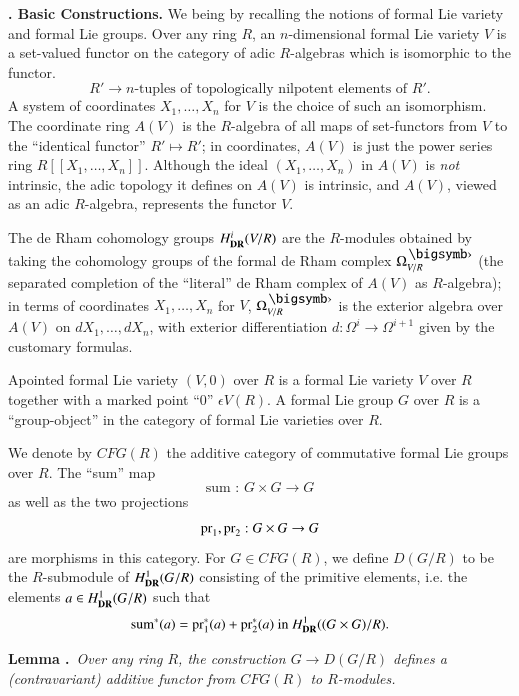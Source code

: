 \noindent
{\bf {}.\label{art6-sec5.1} Basic Constructions.}
We being by recalling the notions of formal Lie variety and formal Lie groups. Over any ring $R$, an $n$-dimensional formal Lie variety $V$ is a set-valued functor on the category of adic $R$-algebras which is isomorphic to the functor.
$$
R'\to n\text{-tuples of topologically nilpotent elements of $R'$.}
$$
A system of coordinates $X_{1},\ldots,X_{n}$ for $V$ is the choice of such an isomorphism. The coordinate ring $A(V)$ is the $R$-algebra of all maps of set-functors from $V$ to the ``identical functor'' $R'\mapsto R'$; in coordinates, $A(V)$ is just the power series ring $R[[X_{1},\ldots,X_{n}]]$. Although the ideal $(X_{1},\ldots,X_{n})$ in $A(V)$ is {\em not} intrinsic, the adic topology it defines on $A(V)$ is intrinsic, and $A(V)$, viewed as an adic $R$-algebra, represents the functor $V$.

The de Rham cohomology groups $H^{i}_{\mathbf{DR}}(V/R)$ are the $R$-modules obtained by taking the cohomology groups of the formal de Rham complex $\Omega^{\bigdot}_{V/R}$ (the separated completion of the ``literal'' de Rham complex of $A(V)$ as $R$-algebra); in terms of coordinates $X_{1},\ldots,X_{n}$ for $V$, $\Omega^{\bigdot}_{V/R}$ is the exterior algebra over $A(V)$ on $dX_{1},\ldots,dX_{n}$, with exterior differentiation $d:\Omega^{i}\to \Omega^{i+1}$ given by the customary formulas.

A\pageoriginale pointed formal Lie variety $(V,0)$ over $R$ is a formal Lie variety $V$ over $R$ together with a marked point ``0'' $\epsilon V(R)$. A formal Lie group $G$ over $R$ is a ``group-object'' in the category of formal Lie varieties over $R$.

We denote by $CFG(R)$ the additive category of commutative formal Lie groups over $R$. The ``sum'' map
$$
\text{sum : }G\times G\to G
$$
as well as the two projections
$$
\operatorname{pr}_{1},\operatorname{pr}_{2} : G\times G\to G
$$
are morphisms in this category. For $G\in CFG(R)$, we define $D(G/R)$ to be the $R$-submodule of $H^{1}_{\mathbf{DR}}(G/R)$ consisting of the primitive elements, i.e. the elements $a\in H^{1}_{\mathbf{DR}}(G/R)$ such that
$$
\text{sum}^{*}(a)=\operatorname{pr}^{*}_{1}(a)+\operatorname{pr}^{*}_{2}(a)\text{~~ in~~ } H^{1}_{\mathbf{DR}}((G\times G)/R).
$$

\medskip
\noindent
{\bf Lemma .\label{art6-lem5.1.1}}~{\em Over any ring $R$, the construction $G\to D(G/R)$ defines a (contravariant) additive functor from $CFG(R)$ to $R$-modules.}
\smallskip

